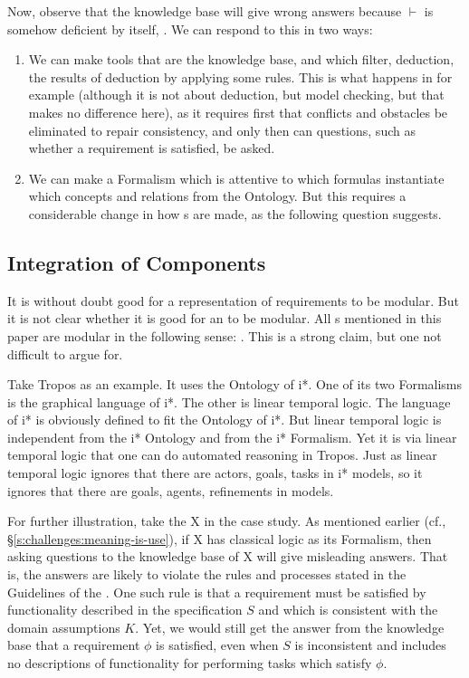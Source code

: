 \documentclass[10pt, final, conference, compsocconf]{IEEEtran}
\begin{document}
Now, observe that the knowledge base will give wrong answers  because $\vdash$ is somehow deficient by itself, . We can respond to this in two ways:
\begin{enumerate}
\item{We can make tools that are  the knowledge base, and which filter,  deduction, the results of deduction by applying some rules. This is what happens in  for example (although it is not about deduction, but model checking, but that makes no difference here), as it requires first that conflicts and obstacles be eliminated to repair consistency, and only then can questions, such as whether a requirement is satisfied, be asked.}
\item{We can make a Formalism which is attentive to which formulas instantiate which concepts and relations from the Ontology. But this requires a considerable change in how s are made, as the following question suggests.}
\end{enumerate}


\subsection{Integration of Components}\label{s:challenges:integration}
It is without doubt good for a representation of requirements to be modular. But it is not clear whether it is good for an  to be modular. All s mentioned in this paper are modular in the following sense: . This is a strong claim, but one not difficult to argue for. 

Take Tropos as an example. It uses the Ontology of i*. One of its two Formalisms is the graphical language of i*. The other is linear temporal logic. The language of i* is obviously defined to fit the Ontology of i*. But linear temporal logic is independent from the i* Ontology and from the i* Formalism. Yet it is via linear temporal logic that one can do automated reasoning in Tropos. Just as linear temporal logic ignores that there are actors, goals, tasks in i* models, so it ignores that there are goals, agents, refinements in  models. 

For further illustration, take the  X in the case study. As mentioned earlier (cf., \S\ref{s:challenges:meaning-is-use}), if X has classical logic as its Formalism, then asking questions to the knowledge base of X will give misleading answers. That is, the answers are likely to violate the rules and processes stated in the Guidelines of the . One such rule is that a requirement must be satisfied by functionality described in the specification $S$ and which is consistent with the domain assumptions $K$. Yet, we would still get the answer from the knowledge base that a requirement $\phi$ is satisfied, even when $S$ is inconsistent and includes no descriptions of functionality for performing tasks which satisfy $\phi$.
\end{document}
